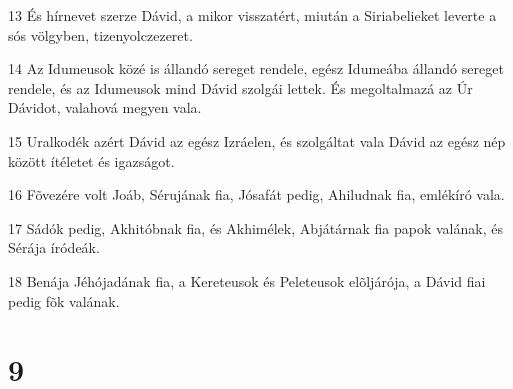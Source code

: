 \par 13 És hírnevet szerze Dávid, a mikor visszatért, miután a Siriabelieket leverte a sós völgyben, tizenyolczezeret.
\par 14 Az Idumeusok közé is állandó sereget  rendele, egész Idumeába állandó sereget rendele, és az Idumeusok mind Dávid szolgái lettek. És megoltalmazá az Úr Dávidot, valahová megyen vala.
\par 15 Uralkodék azért Dávid az egész Izráelen, és szolgáltat vala Dávid az egész nép között ítéletet és igazságot.
\par 16 Fõvezére volt Joáb, Sérujának fia, Jósafát pedig, Ahiludnak fia, emlékíró vala.
\par 17 Sádók pedig, Akhitóbnak fia, és Akhimélek, Abjátárnak fia papok valának, és Sérája íródeák.
\par 18 Benája Jéhójadának fia, a Kereteusok  és Peleteusok elõljárója, a Dávid fiai pedig fõk valának.

\chapter{9}

